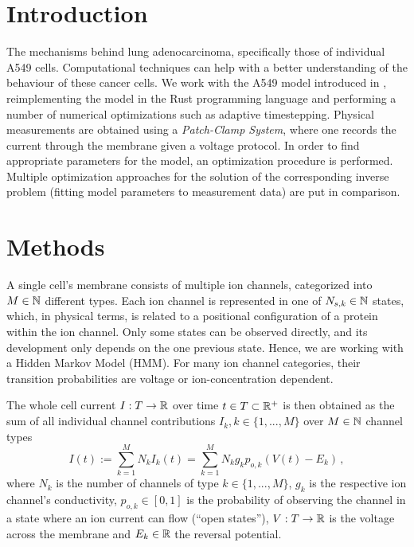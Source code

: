 \section{Introduction}
The mechanisms behind lung adenocarcinoma, specifically those of individual A549 cells.
Computational techniques can help with a better understanding of the behaviour of these cancer cells.
We work with the A549 model introduced in \cite{2021-A549-model,2024-calcium-channels}, reimplementing the model in the Rust programming language and performing a number of numerical optimizations such as adaptive timestepping.
Physical measurements are obtained using a \textit{Patch-Clamp System}, where one records the current through the membrane given a voltage protocol.
In order to find appropriate parameters for the model, an optimization procedure is performed.
Multiple optimization approaches for the solution of the corresponding inverse problem (fitting model parameters to measurement data) are put in comparison.

\section{Methods}
A single cell's membrane consists of multiple ion channels, categorized into $M \in \mathbb{N}$ different types.
Each ion channel is represented in one of $N_{s, k} \in \mathbb{N}$ states, which, in physical terms, is related to a positional configuration of a protein within the ion channel.
Only some states can be observed directly, and its development only depends on the one previous state.
Hence, we are working with a Hidden Markov Model (HMM).
For many ion channel categories, their transition probabilities are voltage or ion-concentration dependent.

The whole cell current $I: T \rightarrow \mathbb{R}$ over time $t \in T \subset \mathbb{R}^+$ is then obtained as the sum of all individual channel contributions $I_k, k \in \{1, ..., M\}$ over $M \in \mathbb{N}$ channel types
\begin{equation}
  I(t) := \sum_{k=1}^{M} N_k I_k(t) = \sum_{k=1}^{M} N_k g_k p_{o,k} \left(V(t)-E_k\right)\,,
  \label{eq:current}
\end{equation}
where $N_k$ is the number of channels of type $k \in \{1, ..., M\}$, $g_k$ is the respective ion channel's conductivity, $p_{o, k} \in [0, 1]$ is the probability of observing the channel in a state where an ion current can flow (``open states''), $V: T \rightarrow \mathbb{R}$ is the voltage across the membrane and $E_k \in \mathbb{R}$ the reversal potential.

